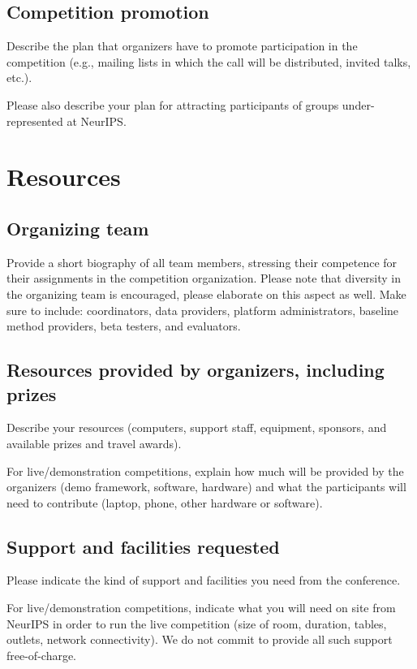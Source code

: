 \documentclass[11pt, oneside]{article}
\begin{document}
\subsection{Competition promotion}

Describe the plan that organizers have to promote participation in the competition (e.g., mailing lists in which the call will be distributed, invited talks, etc.).  


Please also describe your plan  for attracting participants of groups under-represented at NeurIPS. 





\section{Resources}

\subsection{Organizing team}

Provide a short biography of all team members, stressing their competence for their assignments in the competition organization. Please note that diversity in the organizing team is encouraged, please elaborate on this aspect as well.  Make sure to include: coordinators, data providers, platform administrators, baseline method providers, beta testers, and evaluators. 
\subsection{Resources provided by organizers, including prizes}

Describe your resources (computers, support staff, equipment, sponsors, and available prizes and travel awards).

For live/demonstration competitions, explain how much will be provided by the organizers (demo framework, software, hardware) and what the participants will need to contribute (laptop, phone, other hardware or software).

\subsection{Support and facilities requested}
Please indicate the kind of support and facilities you need from the conference. 

For live/demonstration competitions, indicate what you will need on site from NeurIPS in order to run the live competition (size of room, duration, tables, outlets, network connectivity). We do not commit to provide all such support free-of-charge. 
\end{document}
